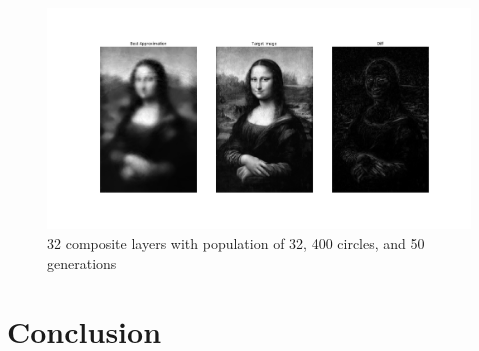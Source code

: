 \documentclass{article}
\begin{document}
\begin{figure}[H]
    \centering
    \includegraphics[width=\textwidth]{output/average32_c400p32g50.png}
    \caption{32 composite layers with population of 32, 400 circles, and 50
        generations}\label{fig:composite-32}
\end{figure}

\section{Conclusion}

\end{document}
